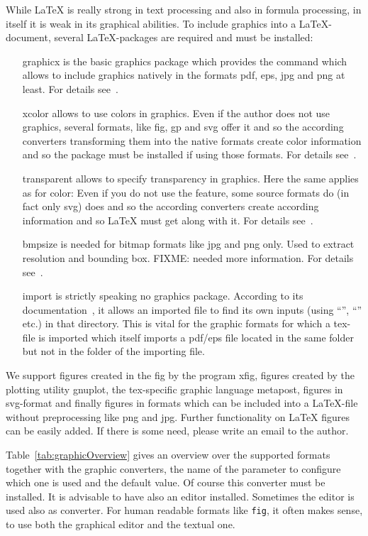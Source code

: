 \documentclass[12pt]{book}
\newcommand{\gls}[1]{#1}
\begin{document}
While \LaTeX{} is really strong in text processing 
and also in formula processing, 
in itself it is weak in its graphical abilities. 
To include graphics into a \LaTeX-document, 
several \LaTeX-packages are required and must be installed: 
%
\begin{itemize}
\item[graphicx]
is the basic graphics package which provides the command 
which allows to include graphics natively 
in the formats pdf, eps, jpg and png at least. 
For details see~\cite{GraX}. 
\item[xcolor]
allows to use colors in graphics. 
Even if the author does not use graphics, 
several formats, like \gls{fig}, \gls{gp} and \gls{svg} 
offer it and so the according converters 
transforming them into the native formats 
create color information and so the package must be installed 
if using those formats. 
For details see~\cite{XColorP}. 
\item[transparent]
allows to specify transparency in graphics. 
Here the same applies as for color: 
Even if you do not use the feature, 
some source formats do (in fact only \gls{svg}) does 
and so the according converters create according information 
and so \LaTeX{} must get along with it. 
For details see~\cite{TransP}. 
\item[bmpsize]
is needed for bitmap formats like \gls{jpg} and \gls{png} only. 
Used to extract resolution and bounding box. 
FIXME\@: needed more information. 
For details see~\cite{BmpP}. 
\item[import]
is strictly speaking no graphics package. 
According to its documentation~\cite{ImpoP}, 
it allows an imported file to find its own inputs 
(using ``'', ``'' etc.) in that directory. 
This is vital for the graphic formats for which a tex-file is imported 
which itself imports a pdf/eps file located in the same folder 
but not in the folder of the importing file. 
\end{itemize}

We support figures created in the \gls{fig} by the program xfig, 
figures created by the plotting utility gnuplot, 
the tex-specific graphic language metapost, 
figures in \gls{svg}-format 
and finally figures in formats which can be included into a \LaTeX-file 
without preprocessing like \gls{png} and \gls{jpg}. 
Further functionality on \LaTeX{} figures can be easily added. 
If there is some need, please write an email to the author. 

Table~\ref{tab:graphicOverview} gives an overview over the supported formats 
together with the graphic converters, 
the name of the parameter to configure which one is used 
and the default value. 
Of course this converter must be installed. 
It is advisable to have also an editor installed. 
Sometimes the editor is used also as converter. 
For human readable formats like \texttt{fig}, it often makes sense, 
to use both the graphical editor and the textual one. 
\end{document}
